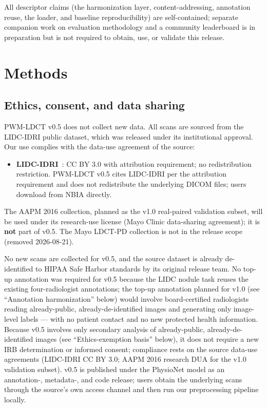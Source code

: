 \documentclass[twoside,11pt]{article}
\begin{document}
All descriptor claims (the harmonization layer, content-addressing, annotation reuse, the loader, and baseline reproducibility) are self-contained; separate companion work on evaluation methodology and a community leaderboard is in preparation but is not required to obtain, use, or validate this release.

\section*{Methods}

\subsection*{Ethics, consent, and data sharing}

PWM-LDCT v0.5 does not collect new data. All scans are sourced from the LIDC-IDRI public dataset, which was released under its institutional approval. Our use complies with the data-use agreement of the source:

\begin{itemize}
    \item \textbf{LIDC-IDRI}~\citep{lidc_idri}: CC BY 3.0 with attribution requirement; no redistribution restriction. PWM-LDCT v0.5 cites LIDC-IDRI per the attribution requirement and does not redistribute the underlying DICOM files; users download from NBIA directly.
\end{itemize}

The AAPM 2016 collection, planned as the v1.0 real-paired validation subset, will be used under its research-use license (Mayo Clinic data-sharing agreement); it is \textbf{not} part of v0.5. The Mayo LDCT-PD collection is not in the release scope (removed 2026-08-21).

No new scans are collected for v0.5, and the source dataset is already de-identified to HIPAA Safe Harbor standards by its original release team. No top-up annotation was required for v0.5 because the LIDC nodule task reuses the existing four-radiologist annotations; the top-up annotation planned for v1.0 (see ``Annotation harmonization'' below) would involve board-certified radiologists reading already-public, already-de-identified images and generating only image-level labels --- with no patient contact and no new protected health information. Because v0.5 involves only secondary analysis of already-public, already-de-identified images (see ``Ethics-exemption basis'' below), it does not require a new IRB determination or informed consent; compliance rests on the source data-use agreements (LIDC-IDRI CC BY 3.0; AAPM 2016 research DUA for the v1.0 validation subset). v0.5 is published under the PhysioNet model as an annotation-, metadata-, and code release; users obtain the underlying scans through the source's own access channel and then run our preprocessing pipeline locally.
\end{document}
